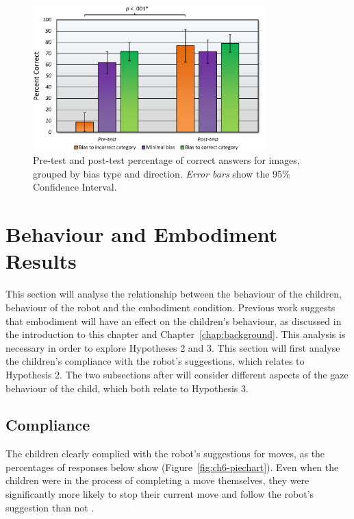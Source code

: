 \begin{figure}[t!]
    \centering
    \includegraphics[width=0.8\textwidth]{images/ch6_BiasLearning.pdf}
    \caption{Pre-test and post-test percentage of correct answers for images, grouped by bias type and direction. \textit{Error bars} show the 95\% Confidence Interval.}
    \label{fig:ch6-combinedbias}
\end{figure}

\section{Behaviour and Embodiment Results} \label{sec:ch6-results-inter}
This section will analyse the relationship between the behaviour of the children, behaviour of the robot and the embodiment condition. Previous work suggests that embodiment will have an effect on the children's behaviour, as discussed in the introduction to this chapter and Chapter~\ref{chap:background}. This analysis is necessary in order to explore Hypotheses 2 and 3. This section will first analyse the children's compliance with the robot's suggestions, which relates to Hypothesis 2. The two subsections after will consider different aspects of the gaze behaviour of the child, which both relate to Hypothesis 3.

\subsection{Compliance}
The children clearly complied with the robot's suggestions for moves, as the percentages of responses below show (Figure~\ref{fig:ch6-piechart}). Even when the children were in the process of completing a move themselves, they were significantly more likely to stop their current move and follow the robot's suggestion than not \citep{kennedy2014children}.

